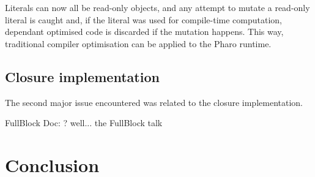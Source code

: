 \documentclass[a4paper,12pt,twoside]{../includes/ThesisStyle}
\begin{document}
Literals can now all be read-only objects, and any attempt to mutate a read-only literal is caught and, if the literal was used for compile-time computation, dependant optimised code is discarded if the mutation happens. This way, traditional compiler optimisation can be applied to the Pharo runtime.

\subsection{Closure implementation}


The second major issue encountered was related to the closure implementation. 

FullBlock
Doc: ? well... the FullBlock talk


\section{Conclusion}


\ifx\wholebook\relax\else
    
\end{document}
